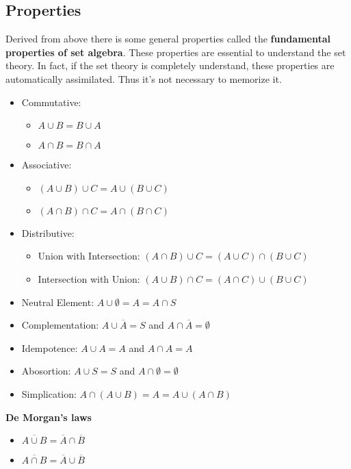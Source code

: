 \subsection{Properties}
Derived from above there is some general properties called the
\textbf{fundamental properties of set algebra}. These properties are essential
to understand the set theory. In fact, if the set theory is completely
understand, these properties are automatically assimilated. Thus it's not
necessary to memorize it. 
\begin{itemize}
   \item Commutative: 
   \begin{itemize}
        \item[] $A \cup B = B \cup A$
        \item[] $A \cap B = B \cap A$
   \end{itemize}
   \item Associative: 
   \begin{itemize}
        \item[] $(A \cup B) \cup C = A \cup (B \cup C)$
        \item[] $(A \cap B) \cap C = A \cap (B \cap C)$
   \end{itemize}
   \item Distributive:
   \begin{itemize}
        \item[] Union with Intersection: $(A \cap B)\cup C = (A\cup C) \cap (B
        \cup C) $
        \item[] Intersection with Union: $(A \cup B)\cap C = (A\cap C) \cup (B
        \cup C) $
   \end{itemize}   
   \item Neutral Element: $A \cup \emptyset = A = A \cap S$
   \item Complementation: $A \cup \overline{A} = S$ and $A\cap \overline{A} =
   \emptyset$
   \item Idempotence: $A \cup A = A$ and $A \cap A = A$
   \item Abosortion: $A \cup S = S$ and $A \cap \emptyset = \emptyset$
   \item Simplication: $A \cap (A \cup B) = A = A \cup (A \cap B)$
\end{itemize}

\textbf{De Morgan's laws}
\begin{itemize}
   \item $\overline{A \cup B} = \overline{A} \cap \overline{B}$
   \item $\overline{A \cap B} = \overline{A} \cup \overline{B}$
\end{itemize}

